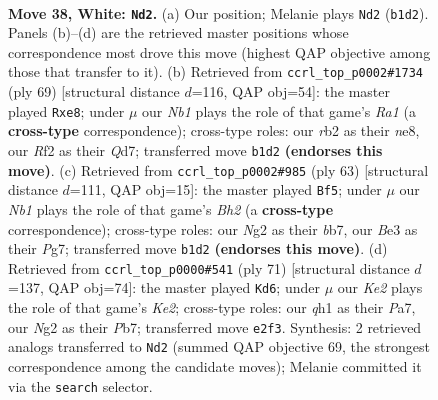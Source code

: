 \documentclass[11pt]{article}
\begin{document}
\clearpage

\begin{figure}[p]\centering
\begin{subfigure}{0.46\textwidth}\centering
\resizebox{\linewidth}{!}{%
\newchessgame
\chessboard[
  setfen={nr4k1/Q4pb1/R7/4p3/4P3/4Bn2/1r2KRN1/1N5q w - - 0 38},
  showmover=false,
  pgfstyle=straightmove, color=movearrow, markmove={b1-d2}
]}
\caption{}
\end{subfigure}\hfill
\begin{subfigure}{0.46\textwidth}\centering
\resizebox{\linewidth}{!}{%
\newchessgame
\chessboard[
  setfen={r3N3/2kq4/2b2n1p/p1Q5/6PP/2P4K/1P6/4RB2 b - - 0 35},
  showmover=false,
  pgfstyle=straightmove, color=movearrow, markmove={a8-e8}
]}
\caption{}
\end{subfigure}
\\[4pt]
\begin{subfigure}{0.46\textwidth}\centering
\resizebox{\linewidth}{!}{%
\newchessgame
\chessboard[
  setfen={6k1/1B4pb/Qn1q3p/4N3/P2P4/6P1/2r2r2/3RR1K1 b - - 2 32},
  showmover=false,
  pgfstyle=straightmove, color=movearrow, markmove={h7-f5}
]}
\caption{}
\end{subfigure}\hfill
\begin{subfigure}{0.46\textwidth}\centering
\resizebox{\linewidth}{!}{%
\newchessgame
\chessboard[
  setfen={8/pp2k2Q/4rb2/2n4P/3q4/8/PPR5/K3R3 b - - 8 36},
  showmover=false,
  pgfstyle=straightmove, color=movearrow, markmove={e7-d6}
]}
\caption{}
\end{subfigure}
\caption{\textbf{Move 38, White: \texttt{Nd2}.} (a) Our position; Melanie plays \texttt{Nd2} (\texttt{b1d2}). Panels (b)--(d) are the retrieved master positions whose correspondence most drove this move (highest QAP objective among those that transfer to it). (b) Retrieved from \texttt{ccrl\_top\_p0002\#1734} (ply 69) [structural distance $d$=116, QAP obj=54]: the master played \texttt{Rxe8}; under $\mu$ our \emph{Nb1} plays the role of that game's \emph{Ra1} (a \textbf{cross-type} correspondence); cross-type roles: our \emph{r}b2 as their \emph{n}e8, our \emph{R}f2 as their \emph{Q}d7; transferred move \texttt{b1d2} \textbf{(endorses this move)}. (c) Retrieved from \texttt{ccrl\_top\_p0002\#985} (ply 63) [structural distance $d$=111, QAP obj=15]: the master played \texttt{Bf5}; under $\mu$ our \emph{Nb1} plays the role of that game's \emph{Bh2} (a \textbf{cross-type} correspondence); cross-type roles: our \emph{N}g2 as their \emph{b}b7, our \emph{B}e3 as their \emph{P}g7; transferred move \texttt{b1d2} \textbf{(endorses this move)}. (d) Retrieved from \texttt{ccrl\_top\_p0000\#541} (ply 71) [structural distance $d$=137, QAP obj=74]: the master played \texttt{Kd6}; under $\mu$ our \emph{Ke2} plays the role of that game's \emph{Ke2}; cross-type roles: our \emph{q}h1 as their \emph{P}a7, our \emph{N}g2 as their \emph{P}b7; transferred move \texttt{e2f3}. Synthesis: 2 retrieved analogs transferred to \texttt{Nd2} (summed QAP objective 69, the strongest correspondence among the candidate moves); Melanie committed it via the \texttt{search} selector.}
\label{fig:thought-m74}
\end{figure}
\end{document}
